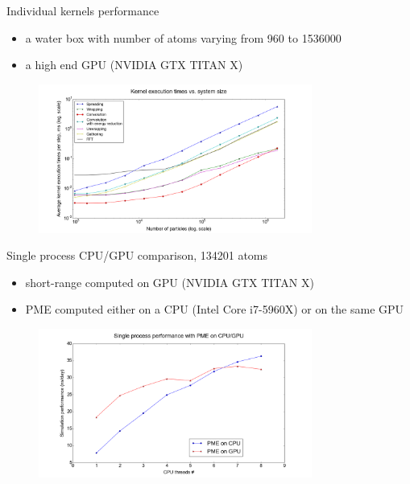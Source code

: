 \documentclass[11pt]{beamer}
\begin{document}
\begin{frame}{Individual kernels performance}
\begin{itemize}
\item a water box with number of atoms varying from 960 to 1536000
\item a high end GPU (NVIDIA GTX TITAN X) 
\end{itemize}
\begin{figure}
    \includegraphics[width=0.8\textwidth]{pics/kernels-noconcur-2.png}
    \label{fig:kernels}
\end{figure}
\end{frame}

\begin{frame}{Single process CPU/GPU comparison, 134201 atoms}
\begin{itemize}
\item short-range computed on GPU (NVIDIA GTX TITAN X)
\item PME computed either on a CPU (Intel Core i7-5960X) or on the same GPU
\end{itemize}
\FloatBarrier
\begin{figure} [h!]
    \centering
    \includegraphics[width=0.8\textwidth]{pics/CPU_GPU_ADH_SINGLE.png}
\end{figure}
\FloatBarrier
\end{frame}
\end{document}

